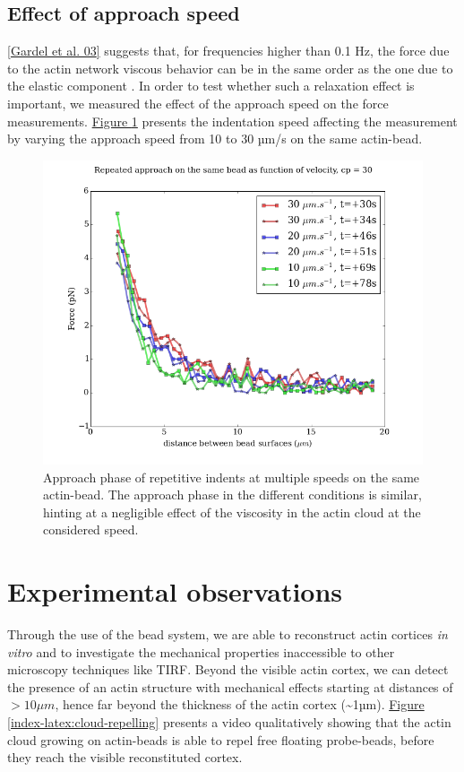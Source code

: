 \documentclass[A4paperpaper,11pt,english]{sphinxmanual}
\begin{document}
\subsection{Effect of approach speed}
\label{index-latex:effect-of-approach-speed}
{\hyperref[index-latex:gardel2003]{{[}Gardel et al. 03{]}}} suggests that, for frequencies higher than 0.1 Hz, the force due to
the actin network viscous behavior can be in the same order as the one due to the elastic
component . In order to test whether such a relaxation effect is important, we measured the effect of the
approach speed on the force measurements. \hyperref[index-latex:many-speed]{Figure  \ref*{index-latex:many-speed}} presents the
indentation speed affecting the measurement by varying the approach speed from 10
to 30 µm/s on the same actin-bead.
\begin{figure}[htbp]
\centering
\capstart

\includegraphics[width=0.600\linewidth]{many_speed.png}
\caption{Approach phase of repetitive indents at multiple speeds on the same
actin-bead. The approach phase in the different conditions is similar,
hinting at  a negligible effect of the viscosity  in the actin cloud at the
considered speed.}\label{index-latex:many-speed}\end{figure}


\section{Experimental observations}
\label{index-latex:experimental-observations}
Through the use of the bead system, we are able to reconstruct actin cortices \emph{in vitro} and
to investigate the mechanical properties inaccessible to other microscopy
techniques like TIRF. Beyond the visible actin cortex, we can detect the
presence of an actin structure with mechanical effects starting at
distances of \(> 10\mu{}m\), hence far beyond the thickness of the actin cortex (\textasciitilde{}1µm).
\hyperref[index-latex:cloud-repelling]{Figure  \ref*{index-latex:cloud-repelling}} presents a video qualitatively showing that the actin cloud growing
on actin-beads is able to repel free floating probe-beads, before they reach the
visible reconstituted cortex.
\end{document}
